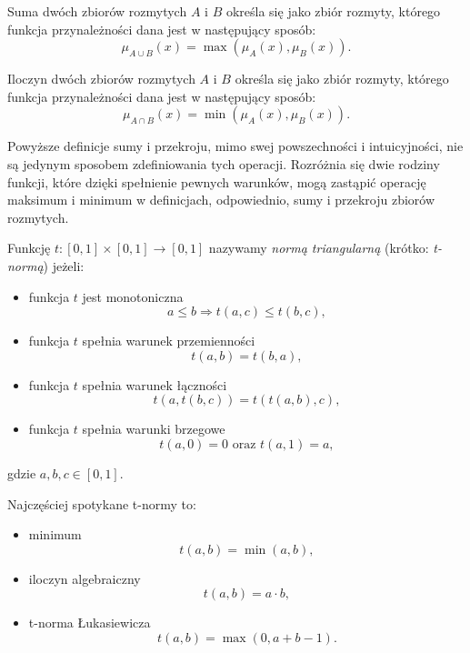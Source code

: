 \begin{definition}
Suma dwóch zbiorów rozmytych $A$ i $B$ określa się jako zbiór rozmyty, którego
funkcja przynależności dana jest w następujący sposób:
\begin{equation}
\mu_{A \cup B}(x) = \max(\mu_A(x), \mu_B(x)).
\end{equation}
\end{definition}

\begin{definition}
Iloczyn dwóch zbiorów rozmytych $A$ i $B$ określa się jako zbiór rozmyty,
którego funkcja przynależności dana jest w następujący sposób:
\begin{equation}
\mu_{A \cap B}(x) = \min(\mu_A(x), \mu_B(x)).
\end{equation}
\end{definition}

Powyższe definicje sumy i przekroju, mimo swej powszechności i intuicyjności,
nie są jedynym sposobem zdefiniowania tych operacji. Rozróżnia się dwie rodziny
funkcji, które dzięki spełnienie pewnych warunków, mogą zastąpić operację
maksimum i minimum w definicjach, odpowiednio, sumy i przekroju zbiorów
rozmytych.

\begin{definition}[t-norma]
Funkcję $t : [0,1] \times [0,1] \rightarrow [0,1]$ nazywamy \emph{normą
triangularną} (krótko: \emph{t-normą}) jeżeli:
\begin{itemize}
  \item funkcja $t$ jest monotoniczna $$a \leq b \Rightarrow t(a,c) \leq
  t(b,c),$$
  \item funkcja $t$ spełnia warunek przemienności $$t(a,b) = t(b,a),$$
  \item funkcja $t$ spełnia warunek łączności $$t(a, t(b,c)) = t(t(a,b),c),$$
  \item funkcja $t$ spełnia warunki brzegowe $$t(a,0)=0 \textrm{ oraz }
  t(a,1)=a,$$
\end{itemize}
gdzie $a, b, c \in [0,1]$.
\end{definition}

Najczęściej spotykane t-normy to:
\begin{itemize}
  \item minimum $$t(a,b) = \min(a,b),$$
  \item iloczyn algebraiczny $$t(a,b) = a \cdot b,$$
  \item t-norma Łukasiewicza $$t(a,b) = \max(0, a+b-1).$$
\end{itemize}

